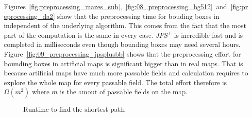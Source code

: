 \documentclass{article}
\begin{document}
    Figures~\ref{fig:preprocessing_mazes_sub},~\ref{fig:08_preprocessing_bg512}~and~\ref{fig:preprocessing_da2} show that the preprocessing time for bouding boxes in independent of the underlying algorithm. This comes from the fact that the most part of the computation is the same in every case. $JPS^+$ is incredible fast and is completed in milliseconds even though bounding boxes may need several hours. Figure~\ref{fig:09_preprocessing_jpsplusbb} shows that the preprocessing effort for bounding boxes in artificial maps is significant bigger than in real maps. That is because artificial maps have much more passable fields and calculation requires to explore the whole map for every passable field. The total effort therefore is $\Omega(m^2)$ where $m$ is the amout of passable fields on the map.
    
    \begin{figure}[!htb]
        \centering
        
        \caption{Runtime to find the shortest path.}
        
        
        \hfill
        

\end{figure}
\end{document}
